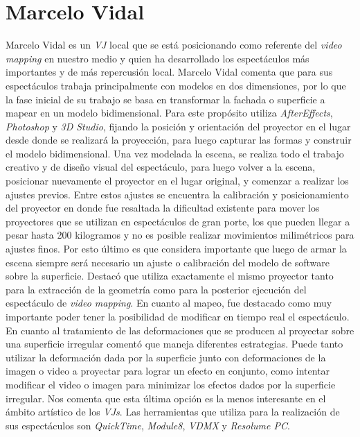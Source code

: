 \section{Marcelo Vidal}
Marcelo Vidal\cite{Chindogu} es un \emph{VJ} local que se está posicionando como referente del \emph{video mapping} en nuestro medio y quien ha desarrollado los espectáculos más importantes y de más repercusión local.
Marcelo Vidal comenta que para sus espectáculos trabaja principalmente con modelos en dos dimensiones, por lo que la fase inicial de su trabajo se basa en transformar la fachada o superficie a mapear en un modelo bidimensional. Para este propósito utiliza \emph{AfterEffects}, \emph{Photoshop} y \emph{3D Studio}, %
fijando la posición y orientación del proyector en el lugar desde donde se realizará la proyección, para luego capturar las formas y construir el modelo bidimensional.
Una vez modelada la escena, se realiza todo el trabajo creativo y de diseño visual del espectáculo, para luego volver a la escena, posicionar nuevamente el proyector en el lugar original, y comenzar a realizar los ajustes previos. Entre estos ajustes se encuentra la calibración y posicionamiento del proyector en donde fue resaltada la dificultad existente para mover los proyectores que se utilizan en espectáculos de gran porte, los que pueden llegar a pesar hasta 200 kilogramos y no es posible realizar movimientos milimétricos para ajustes finos. Por esto último es que considera importante que luego de armar la escena siempre será necesario un ajuste o calibración del modelo de software sobre la superficie. Destacó que utiliza exactamente el mismo proyector tanto para la extracción de la geometría como para la posterior ejecución del espectáculo de \emph{video mapping}.
En cuanto al mapeo, fue destacado como muy importante poder tener la posibilidad de modificar en tiempo real el espectáculo. En cuanto al tratamiento de las deformaciones que se producen al proyectar sobre una superficie irregular comentó que maneja diferentes estrategias. Puede tanto utilizar la deformación dada por la superficie junto con deformaciones de la imagen o video a proyectar para lograr un efecto en conjunto, como intentar modificar el video o imagen para minimizar los efectos dados por la superficie irregular. Nos comenta que esta última opción es la menos interesante en el ámbito artístico de los \emph{VJs}. Las herramientas que utiliza para la realización de sus espectáculos son \emph{QuickTime}, \emph{Module8}, \emph{VDMX} y \emph{Resolume PC}.

